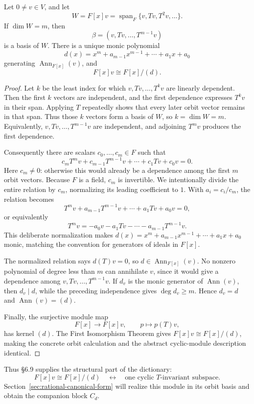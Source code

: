 \begin{proposition}
\label{prop:cyclic-subspace-annihilator}
Let \(0\ne v\in V\), and let
\[
W=F[x]v=\operatorname{span}_F\{v,Tv,T^2v,\ldots\}.
\]
If \(\dim W=m\), then
\[
\beta=(v,Tv,\ldots,T^{m-1}v)
\]
is a basis of \(W\). There is a unique monic polynomial
\[
d(x)=x^m+a_{m-1}x^{m-1}+\cdots+a_1x+a_0
\]
generating \(\operatorname{Ann}_{F[x]}(v)\), and
\[
F[x]v\cong F[x]/(d).
\]
\end{proposition}
\begin{proof}
Let \(k\) be the least index for which
\(v,Tv,\ldots,T^kv\) are linearly dependent. Then the first \(k\) vectors
are independent, and the first dependence expresses \(T^kv\) in their span.
Applying \(T\) repeatedly shows that every later orbit vector remains in that
span. Thus those \(k\) vectors form a basis of \(W\), so \(k=\dim W=m\).
Equivalently, \(v,Tv,\ldots,T^{m-1}v\) are independent, and adjoining
\(T^mv\) produces the first dependence.

Consequently there are scalars \(c_0,\ldots,c_m\in F\) such that
\[
c_mT^mv+c_{m-1}T^{m-1}v+\cdots+c_1Tv+c_0v=0.
\]
Here \(c_m\ne0\): otherwise this would already be a dependence among the
first \(m\) orbit vectors. Because \(F\) is a field, \(c_m\) is invertible.
We intentionally divide the entire relation by \(c_m\), normalizing its
leading coefficient to \(1\). With \(a_i=c_i/c_m\), the relation becomes
\[
T^mv+a_{m-1}T^{m-1}v+\cdots+a_1Tv+a_0v=0,
\]
or equivalently
\[
T^mv=-a_0v-a_1Tv-\cdots-a_{m-1}T^{m-1}v.
\]
This deliberate normalization makes
\(d(x)=x^m+a_{m-1}x^{m-1}+\cdots+a_1x+a_0\) monic, matching the convention
for generators of ideals in \(F[x]\).

The normalized relation says \(d(T)v=0\), so
\(d\in\operatorname{Ann}_{F[x]}(v)\). No nonzero polynomial of degree less
than \(m\) can annihilate \(v\), since it would give a dependence among
\(v,Tv,\ldots,T^{m-1}v\). If \(d_v\) is the monic generator of
\(\operatorname{Ann}(v)\), then \(d_v\mid d\), while the preceding
independence gives \(\deg d_v\geq m\). Hence \(d_v=d\) and
\(\operatorname{Ann}(v)=(d)\).

Finally, the surjective module map
\[
F[x]\longrightarrow F[x]v,\qquad p\longmapsto p(T)v,
\]
has kernel \((d)\). The First Isomorphism Theorem gives
\(F[x]v\cong F[x]/(d)\), making the concrete orbit calculation and the
abstract cyclic-module description identical.
\end{proof}

Thus §6.9 supplies the structural part of the dictionary:
\[
F[x]v\cong F[x]/(d)
\quad\longleftrightarrow\quad
\text{one cyclic \(T\)-invariant subspace}.
\]
Section~\ref{sec:rational-canonical-form} will realize this module in its
orbit basis and obtain the companion block \(C_d\).

